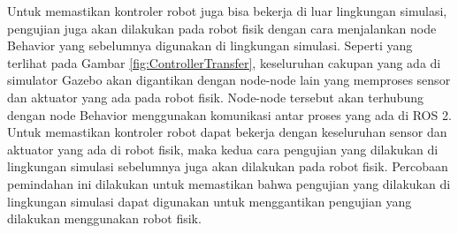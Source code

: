 Untuk memastikan kontroler robot juga bisa bekerja di luar lingkungan simulasi, pengujian juga akan dilakukan pada robot fisik dengan cara menjalankan node Behavior yang sebelumnya digunakan di lingkungan simulasi.
Seperti yang terlihat pada Gambar \ref{fig:ControllerTransfer}, keseluruhan cakupan yang ada di simulator Gazebo akan digantikan dengan node-node lain yang memproses sensor dan aktuator yang ada pada robot fisik.
Node-node tersebut akan terhubung dengan node Behavior menggunakan komunikasi antar proses yang ada di ROS 2.
Untuk memastikan kontroler robot dapat bekerja dengan keseluruhan sensor dan aktuator yang ada di robot fisik, maka kedua cara pengujian yang dilakukan di lingkungan simulasi sebelumnya juga akan dilakukan pada robot fisik.
Percobaan pemindahan ini dilakukan untuk memastikan bahwa pengujian yang dilakukan di lingkungan simulasi dapat digunakan untuk menggantikan pengujian yang dilakukan menggunakan robot fisik.
